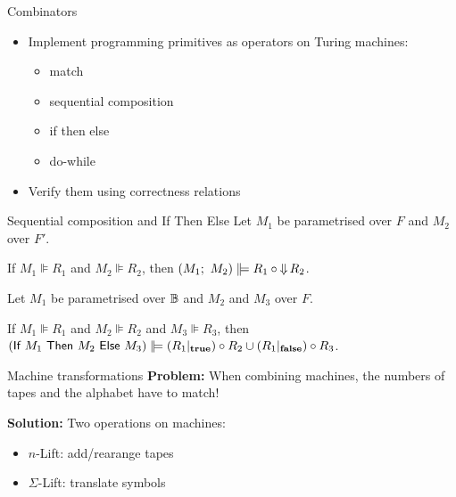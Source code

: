 \begin{frame}{Combinators}
  \begin{itemize}
    \item Implement programming primitives as operators on Turing machines:
    \begin{itemize}
      \item match
      \item sequential composition
      \item if then else
      \item do-while
    \end{itemize}
  \item Verify them using correctness relations
  \end{itemize}
\end{frame}

\begin{frame}{Sequential composition and If Then Else}
  Let $M_1$ be parametrised over $F$ and $M_2$ over $F'$.
  \begin{corollary}
    If $M_1 \VDash R_1$ and $M_2 \VDash R_2$, then $(M_1 \mseq M_2) \VDash R_1 \circ \hideParam R_2$.
  \end{corollary}
  \bigskip
  \pause
  Let $M_1$ be parametrised over $\mathbb{B}$ and $M_2$ and $M_3$ over $F$.
  \begin{corollary}
    If $M_1 \VDash R_1$ and $M_2 \VDash R_2$ and $M_3 \VDash R_3$, then
    $(\mif{M_1}{M_2}{M_3}) \VDash (R_1 \at \true) \circ R_2 \cup (R_1 \at \false) \circ R_3$.
  \end{corollary}
\end{frame}

\begin{frame}{Machine transformations}
  \textbf{Problem:}
  When combining machines, the numbers of tapes and the alphabet have to match!
  \pause%
  \bigskip

  \textbf{Solution:} Two operations on machines:
  \begin{itemize}
    \item $n$-Lift: add/rearange tapes
    \item $\Sigma$-Lift: translate symbols
  \end{itemize}
\end{frame}

